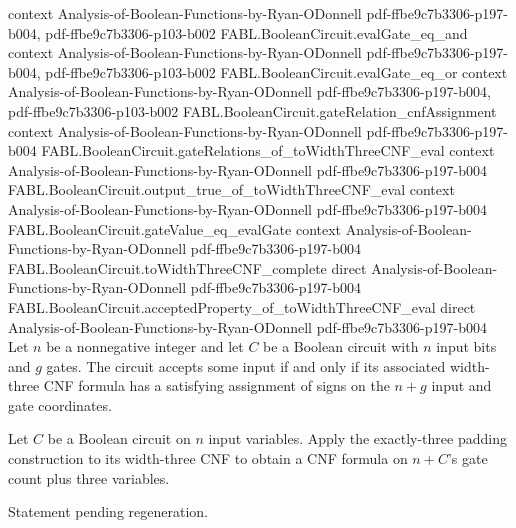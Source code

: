 \begin{theorem}
  {context}
  {Analysis-of-Boolean-Functions-by-Ryan-ODonnell}
  {pdf-ffbe9c7b3306-p197-b004,
    pdf-ffbe9c7b3306-p103-b002}
\proofstep
  {FABL.BooleanCircuit.evalGate_eq_and}
  {context}
  {Analysis-of-Boolean-Functions-by-Ryan-ODonnell}
  {pdf-ffbe9c7b3306-p197-b004,
    pdf-ffbe9c7b3306-p103-b002}
\proofstep
  {FABL.BooleanCircuit.evalGate_eq_or}
  {context}
  {Analysis-of-Boolean-Functions-by-Ryan-ODonnell}
  {pdf-ffbe9c7b3306-p197-b004,
    pdf-ffbe9c7b3306-p103-b002}
\proofstep
  {FABL.BooleanCircuit.gateRelation_cnfAssignment}
  {context}
  {Analysis-of-Boolean-Functions-by-Ryan-ODonnell}
  {pdf-ffbe9c7b3306-p197-b004}
\proofstep
  {FABL.BooleanCircuit.gateRelations_of_toWidthThreeCNF_eval}
  {context}
  {Analysis-of-Boolean-Functions-by-Ryan-ODonnell}
  {pdf-ffbe9c7b3306-p197-b004}
\proofstep
  {FABL.BooleanCircuit.output_true_of_toWidthThreeCNF_eval}
  {context}
  {Analysis-of-Boolean-Functions-by-Ryan-ODonnell}
  {pdf-ffbe9c7b3306-p197-b004}
\proofstep
  {FABL.BooleanCircuit.gateValue_eq_evalGate}
  {context}
  {Analysis-of-Boolean-Functions-by-Ryan-ODonnell}
  {pdf-ffbe9c7b3306-p197-b004}
\proofstep
  {FABL.BooleanCircuit.toWidthThreeCNF_complete}
  {direct}
  {Analysis-of-Boolean-Functions-by-Ryan-ODonnell}
  {pdf-ffbe9c7b3306-p197-b004}
\proofstep
  {FABL.BooleanCircuit.acceptedProperty_of_toWidthThreeCNF_eval}
  {direct}
  {Analysis-of-Boolean-Functions-by-Ryan-ODonnell}
  {pdf-ffbe9c7b3306-p197-b004}
Let $n$ be a nonnegative integer and let $C$ be a Boolean circuit with $n$ input bits
and $g$ gates. The circuit accepts some input if and only if its associated width-three
CNF formula has a satisfying assignment of signs on the $n+g$ input and gate
coordinates.
\end{theorem}

\begin{definition}
\label{FABL.BooleanCircuit.toExactlyThreeCNF}
\leanok
{}
Let $C$ be a Boolean circuit on $n$ input variables. Apply the exactly-three padding
construction to its width-three CNF to obtain a CNF formula on $n+C$'s gate count plus
three variables.
\end{definition}

\begin{theorem}
\label{FABL.BooleanCircuit.toExactlyThreeCNF_clause_width_eq_three}
\leanok
{}
Statement pending regeneration.
\end{theorem}

